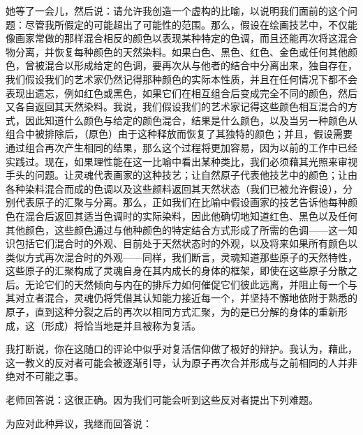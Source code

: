 她等了一会儿，然后说：请允许我创造一个虚构的比喻，以说明我们面前的这个问题：尽管我所假定的可能超出了可能性的范围。那么，假设在绘画技艺中，不仅能像画家常做的那样混合相反的颜色以表现某种特定的色调，而且还能再次将这混合物分离，并恢复每种颜色的天然染料。如果白色、黑色、红色、金色或任何其他颜色，曾被混合以形成给定的色调，要再次从与他者的结合中分离出来，独自存在，我们假设我们的艺术家仍然记得那种颜色的实际本性质，并且在任何情况下都不会表现出遗忘，例如红色或黑色，如果它们在相互组合后变成完全不同的颜色，然后又各自返回其天然染料。我说，我们假设我们的艺术家记得这些颜色相互混合的方式，因此知道什么颜色与给定的颜色混合，结果是什么颜色，以及当另一种颜色从组合中被排除后，（原色）由于这种释放而恢复了其独特的颜色；并且，假设需要通过组合再次产生相同的结果，那么这个过程将更加容易，因为以前的工作中已经实践过。现在，如果理性能在这一比喻中看出某种类比，我们必须藉其光照来审视手头的问题。让灵魂代表画家的这种技艺；让自然原子代表他技艺中的颜色；让由各种染料混合而成的色调以及这些颜料返回其天然状态（我们已被允许假设），分别代表原子的汇聚与分离。那么，正如我们在比喻中假设画家的技艺告诉他每种颜色在混合后返回其适当色调时的实际染料，因此他确切地知道红色、黑色以及任何其他颜色，这些颜色通过与他种颜色的特定结合方式形成了所需的色调——这一知识包括它们混合时的外观、目前处于天然状态时的外观，以及将来如果所有颜色以类似方式再次混合时的外观——同样，我们断言，灵魂知道那些原子的天然特性，这些原子的汇聚构成了灵魂自身在其内成长的身体的框架，即使在这些原子分散之后。无论它们的天然倾向与内在的排斥力如何催促它们彼此远离，并阻止每一个与其对立者混合，灵魂仍将凭借其认知能力接近每一个，并坚持不懈地依附于熟悉的原子，直到这种分裂之后的再次以相同方式汇聚，为的是已分解的身体的重新形成，这（形成）将恰当地是并且被称为复活。\par

我打断说，你在这随口的评论中似乎对复活信仰做了极好的辩护。我认为，藉此，这一教义的反对者可能会被逐渐引导，认为原子再次合并形成与之前相同的人并非绝对不可能之事。\par

老师回答说：这很正确。因为我们可能会听到这些反对者提出下列难题。\par

为应对此种异议，我继而回答说：\par

